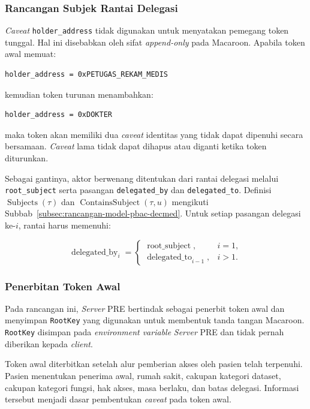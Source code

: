 \documentclass[bahasa, 12pt, a4paper, onecolumn, oneside, final]{report}
\begin{document}
\subsubsection{Rancangan Subjek Rantai Delegasi}

\textit{Caveat} \texttt{holder\_address} tidak digunakan untuk menyatakan pemegang token tunggal. Hal ini disebabkan oleh sifat \textit{append-only} pada Macaroon. Apabila token awal memuat:

\begin{verbatim}
holder_address = 0xPETUGAS_REKAM_MEDIS
\end{verbatim}

kemudian token turunan menambahkan:

\begin{verbatim}
holder_address = 0xDOKTER
\end{verbatim}

maka token akan memiliki dua \textit{caveat} identitas yang tidak dapat dipenuhi secara bersamaan. \textit{Caveat} lama tidak dapat dihapus atau diganti ketika token diturunkan.

Sebagai gantinya, aktor berwenang ditentukan dari rantai delegasi melalui \texttt{root\_subject} serta pasangan \texttt{delegated\_by} dan \texttt{delegated\_to}. Definisi $\operatorname{Subjects}(\tau)$ dan $\operatorname{ContainsSubject}(\tau,u)$ mengikuti Subbab~\ref{subsec:rancangan-model-pbac-decmed}. Untuk setiap pasangan delegasi ke-$i$, rantai harus memenuhi:

\begin{equation}
	\operatorname{delegated\_by}_{i}
	=
	\begin{cases}
		\operatorname{root\_subject},
		 & i=1, \\
		\operatorname{delegated\_to}_{i-1},
		 & i>1.
	\end{cases}
\end{equation}

\subsubsection{Penerbitan Token Awal}

Pada rancangan ini, \textit{Server} PRE bertindak sebagai penerbit token awal dan menyimpan \texttt{RootKey} yang digunakan untuk membentuk tanda tangan Macaroon. \texttt{RootKey} disimpan pada \textit{environment variable} \textit{Server} PRE dan tidak pernah diberikan kepada \textit{client}.

Token awal diterbitkan setelah alur pemberian akses oleh pasien telah terpenuhi. Pasien menentukan penerima awal, rumah sakit, cakupan kategori dataset, cakupan kategori fungsi, hak akses, masa berlaku, dan batas delegasi. Informasi tersebut menjadi dasar pembentukan \textit{caveat} pada token awal.
\end{document}
